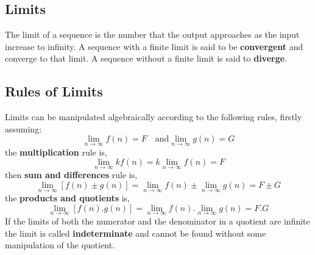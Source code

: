     \subsection{Limits}
        The limit of a sequence is the number that the output approaches as the input increase to infinity. A sequence 
        with a finite limit is said to be \textbf{convergent} and converge to that limit. A sequence without a finite 
        limit is said to \textbf{diverge}.

    \subsection{Rules of Limits}
        Limits can be manipulated algebraically according to the following rules, firstly assuming:
        \begin{equation}
            \lim_{n\to\infty} f(n) = F \quad \textrm{and} \lim_{n\to\infty} g(n) = G
        \end{equation}
        the \textbf{multiplication} rule is,
        \begin{equation}
            \lim_{n\to\infty} kf(n) = k \lim_{n\to\infty} f(n) = F
        \end{equation}
        then \textbf{sum and differences} rule is,
        \begin{equation}
            \lim_{n\to\infty}{[f(n) \pm g(n)]} = \lim_{n\to\infty} f(n) \pm \lim_{n\to\infty} g(n) = F \pm G
        \end{equation}
        the \textbf{products and quotients} is,
        \begin{equation}
            \lim_{n\to\infty}{[f(n).g(n)]} = \lim_{n\to\infty} f(n) . \lim_{n\to\infty} g(n) = F.G
        \end{equation}
        If the limits of both the numerator and the denominator in a quotient are infinite the limit is called 
        \textbf{indeterminate} and cannot be found without some manipulation of the quotient.
